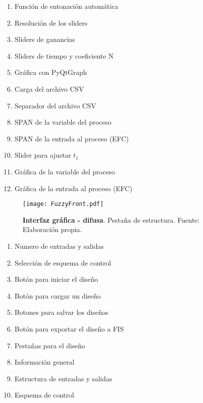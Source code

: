     \begin{multicols}{2}
        \begin{enumerate}[leftmargin=20pt]
            \item Función de entonación automática
            \item Resolución de los sliders
            \item Sliders de ganancias
            \item Sliders de tiempo y coeficiente N
            \item Gráfica con PyQtGraph
            \item Carga del archivo CSV
            \item Separador del archivo CSV
            \item SPAN de la variable del proceso
            \item SPAN de la entrada al proceso (EFC)
            \item Slider para ajustar $t_1$
            \item Gráfica de la variable del proceso
            \item Gráfica de la entrada al proceso (EFC)
        \end{enumerate}
    \end{multicols}

    
    \vfill
    
    \begin{figure}[htb]
        \centering
        \texttt{[image: FuzzyFront.pdf]}
        \caption[Interfaz gráfica - difusa - estructura]{\textbf{Interfaz gráfica - difusa}. Pestaña de estructura. Fuente: Elaboración propia.} 
        \label{fig:FuzzyFront}
    \end{figure}
    
    \vfill

    \begin{multicols}{2}
        \begin{enumerate}[leftmargin=20pt]
            \item Numero de entradas y salidas
            \item Selección de esquema de control
            \item Botón para iniciar el diseño
            \item Botón para cargar un diseño
            \item Botones para salvar los diseños
            \item Botón para exportar el diseño a FIS
            \item Pestañas para el diseño
            \item Información general
            \item Estructura de entradas y salidas
            \item Esquema de control
        \end{enumerate}
    \end{multicols}

